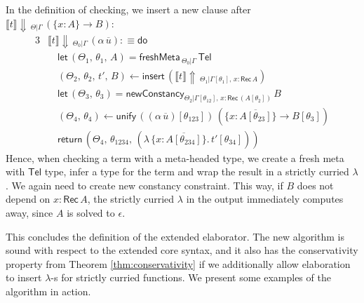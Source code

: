 \documentclass[acmsmall,review,anonymous,prologue,dvipsnames]{acmart}\settopmatter{printfolios=true,printccs=false,printacmref=false}
\newcommand{\slet}{\boldsymbol{\mathsf{let}}}
\newcommand{\freshMeta}[3]{\mathsf{freshMeta}\,_{#1|#2}\,#3}
\newcommand{\newConstancy}[5]{\mathsf{newConstancy}_{#1|#2,\,#3 : \Rec\,#4}\,#5}
\newcommand{\unify}{\mathsf{unify}}
\newcommand{\echeck}[4]{\llbracket#1\rrbracket\!\Downarrow\,_{#2|#3}\,#4}
\newcommand{\einfer}[3]{\llbracket#1\rrbracket\!\Uparrow\,_{#2|#3}}
\newcommand{\edo}{\boldsymbol{\mathsf{do}}}
\newcommand{\ereturn}{\boldsymbol{\mathsf{return}}}
\newcommand{\einsert}{\mathsf{insert}}
\newcommand{\Tel}{\mathsf{Tel}}
\newcommand{\Rec}{\mathsf{Rec}}
\newcommand{\ol}[1]{\overline{#1}}
\theoremstyle{remark}
\begin{document}
In the definition of checking, we insert a new clause after
$\echeck{t}{\Theta}{\Gamma}{(\{x : A\}\to B)}$:
\begin{alignat*}{3}
& \echeck{t}{\Theta_0}{\Gamma}{(\alpha\,\ol{u})} :\equiv \edo\\
& \quad \slet\,(\Theta_1,\,\theta_1,\,A) = \freshMeta{\Theta_0}{\Gamma}{\Tel}\\
&\quad(\Theta_2,\,\theta_2,\,t',\,B)\leftarrow
            \einsert\,(\einfer{t}{\Theta_1}{\Gamma[\theta_1],\,x:\Rec\,A}) \\
& \quad \slet\,(\Theta_3,\,\theta_3) = \newConstancy{\Theta_2}{\Gamma[\theta_{12}]}{x}{(A[\theta_2])}{B}\\
& \quad (\Theta_4,\,\theta_4) \leftarrow
            \unify\, ((\alpha\,\ol{u})[\theta_{123}])\,(\{x : \ol{A[\theta_{23}]}\} \to B[\theta_3])\\
& \quad \ereturn\,(\Theta_4,\,\theta_{1234},\,(\lambda\,\{x : \ol{A[\theta_{234}]}\}.\,t'[\theta_{34}]))
\end{alignat*}
Hence, when checking a term with a meta-headed type, we create a fresh meta with
$\Tel$ type, infer a type for the term and wrap the result in a strictly curried
$\lambda$. We again need to create new constancy constraint. This way, if $B$
does not depend on $x : \Rec\,A$, the strictly curried $\lambda$ in the output
immediately computes away, since $A$ is solved to $\epsilon$.

This concludes the definition of the extended elaborator. The new algorithm is
sound with respect to the extended core syntax, and it also has the
conservativity property from Theorem \ref{thm:conservativity} if we additionally
allow elaboration to insert $\lambda$-s for strictly curried functions. We present
some examples of the algorithm in action.
\end{document}
